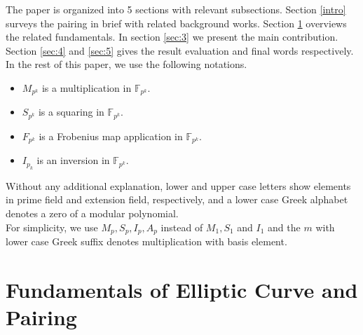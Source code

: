 The paper is organized into 5 sections with relevant subsections.
Section \ref{intro} surveys the pairing in brief with related background works.
Section \ref{sec:1} overviews the related fundamentals.
In section \ref{sec:3} we present the main contribution.
Section \ref{sec:4} and \ref{sec:5} gives the result evaluation and final words respectively. \\
In the rest of this paper, we use the following notations.
 \begin{itemize}
   \item $M_{p^k}$ is a multiplication in  $\mathbb{F}_{p^{k}}$.
   \item $S_{p^k}$ is a squaring in  $\mathbb{F}_{p^{k}}$.
   \item $F_{p^k}$ is a Frobenius map application in  $\mathbb{F}_{p^{k}}$.
   \item $I_{p_k}$ is an inversion in  $\mathbb{F}_{p^{k}}$.
\end{itemize}
Without any additional explanation, lower and upper case letters show elements in prime field and extension field, respectively, and a lower case Greek alphabet denotes a zero of a modular polynomial.\\
For simplicity, we use $M_p, S_p, I_p, A_p$ instead of $M_1, S_1$ and $I_1$ and 
the $m$ with lower case Greek suffix denotes multiplication with basis element.



\section{Fundamentals of Elliptic Curve and Pairing}\label{sec:1}
